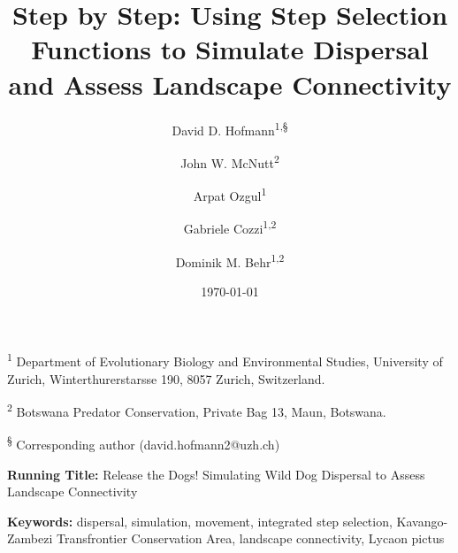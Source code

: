 \documentclass[abstract=on,10pt,a4paper,bibliography=totocnumbered]{article}
\title{Step by Step: Using Step Selection Functions to Simulate Dispersal and
Assess Landscape Connectivity}
\author{
  David D. Hofmann\textsuperscript{1,\S} \and
  John W. McNutt\textsuperscript{2} \and
  Arpat Ozgul\textsuperscript{1} \and
  Gabriele Cozzi\textsuperscript{1,2} \and
  Dominik M. Behr\textsuperscript{1,2}
}
\date{\today}
\begin{document}



\maketitle

\begin{flushleft}

\vspace{0.5cm}

\textsuperscript{1} Department of Evolutionary Biology and Environmental
Studies, University of Zurich, Winterthurerstarsse 190, 8057 Zurich,
Switzerland.

\textsuperscript{2} Botswana Predator Conservation, Private Bag 13, Maun,
Botswana.

\textsuperscript{\S} Corresponding author (david.hofmann2@uzh.ch)

\vspace{4cm}

\textbf{Running Title:} Release the Dogs! Simulating Wild Dog Dispersal to
Assess Landscape Connectivity

\vspace{0.5cm}

\textbf{Keywords:} dispersal, simulation, movement, integrated step selection,
Kavango-Zambezi Transfrontier Conservation Area, landscape connectivity, Lycaon
pictus

\end{flushleft}
\end{document}
